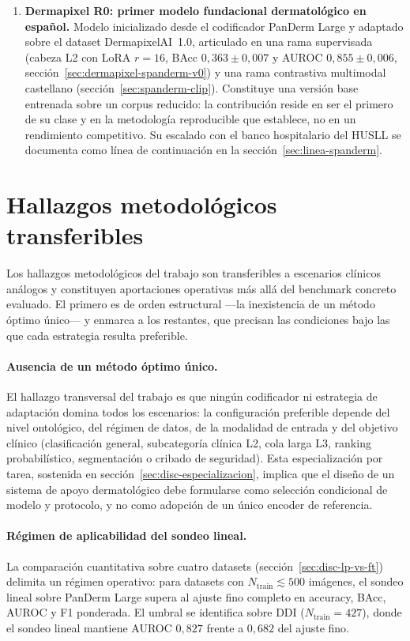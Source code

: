 \begin{enumerate}
\item \textbf{Dermapixel R0: primer modelo fundacional
dermatológico en español.} Modelo inicializado desde el
codificador PanDerm Large y adaptado sobre el dataset
DermapixelAI~1.0, articulado en una rama supervisada (cabeza L2
con LoRA $r=16$, BAcc $0{,}363 \pm 0{,}007$ y AUROC
$0{,}855 \pm 0{,}006$, sección~\ref{sec:dermapixel-spanderm-v0})
y una rama contrastiva multimodal castellano
(sección~\ref{sec:spanderm-clip}). Constituye una versión base
entrenada sobre un corpus reducido: la contribución reside en ser
el primero de su clase y en la metodología reproducible que
establece, no en un rendimiento competitivo. Su escalado con el
banco hospitalario del HUSLL se documenta como línea de
continuación en la sección~\ref{sec:linea-spanderm}.
\end{enumerate}

\section{Hallazgos metodológicos transferibles}
\label{sec:hallazgos-conc}

Los hallazgos metodológicos del trabajo son transferibles a
escenarios clínicos análogos y constituyen aportaciones operativas
más allá del benchmark concreto evaluado. El primero es de orden
estructural ---la inexistencia de un método óptimo único--- y
enmarca a los restantes, que precisan las condiciones bajo las que
cada estrategia resulta preferible.

\paragraph{Ausencia de un método óptimo único.}
El hallazgo transversal del trabajo es que ningún codificador ni
estrategia de adaptación domina todos los escenarios: la
configuración preferible depende del nivel ontológico, del régimen
de datos, de la modalidad de entrada y del objetivo clínico
(clasificación general, subcategoría clínica L2, cola larga L3,
ranking probabilístico, segmentación o cribado de seguridad). Esta
especialización por tarea, sostenida en
sección~\ref{sec:disc-especializacion}, implica que el diseño de un
sistema de apoyo dermatológico debe formularse como selección
condicional de modelo y protocolo, y no como adopción de un único
encoder de referencia.

\paragraph{Régimen de aplicabilidad del sondeo lineal.}
La comparación cuantitativa sobre cuatro datasets
(sección~\ref{sec:disc-lp-vs-ft}) delimita un régimen operativo: para
datasets con $N_{\mathrm{train}} \lesssim 500$ imágenes, el
sondeo lineal sobre PanDerm Large supera al ajuste fino completo
en accuracy, BAcc, AUROC y F1 ponderada. El umbral se identifica
sobre DDI ($N_{\mathrm{train}} = 427$), donde el sondeo lineal
mantiene AUROC $0{,}827$ frente a $0{,}682$ del ajuste fino.

